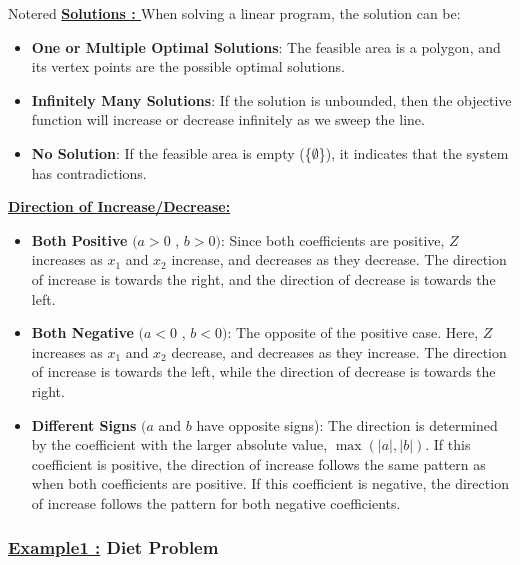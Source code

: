 \begin{prettyBox}{Note}{red}
 \textbf{\underline{Solutions : }}
When solving a linear program, the solution can be:
\begin{itemize}
    \item \textbf{One or Multiple Optimal Solutions}: The feasible area is a polygon, and its vertex points are the possible optimal solutions.
    \item \textbf{Infinitely Many Solutions}: If the solution is unbounded, then the objective function will increase or decrease infinitely as we sweep the line.
    \item \textbf{No Solution}: If the feasible area is empty (\{\(\emptyset\)\}), it indicates that the
system has contradictions.
\end{itemize}


\textbf{\underline{Direction of Increase/Decrease:}}

\begin{itemize}
    \item \textbf{Both Positive} \((a > 0\) , \(b > 0)\): Since both coefficients are positive, \( Z \) increases as
\( x_1 \) and \( x_2 \) increase, and decreases as they decrease. The direction of increase is towards the right,
and the direction of decrease is towards the left.

    \item \textbf{Both Negative} \((a < 0\) , \(b < 0)\): The opposite of the positive case. Here, \( Z \) increases
as \( x_1 \) and \( x_2 \) decrease, and decreases as they increase. The direction of increase is towards the left,
while the direction of decrease is towards the right.

    \item \textbf{Different Signs} \((a\) and \(b\) have opposite signs): The direction is determined by 
the coefficient with the larger absolute value, \(\max(|a|, |b|)\). If this coefficient is positive, the direction 
of increase follows the same pattern as when both coefficients are positive. If this coefficient is negative, 
the direction of increase follows the pattern for both negative coefficients.
\end{itemize}
\end{prettyBox}



\subsubsection*{{\underline{Example1 :} Diet Problem}}

